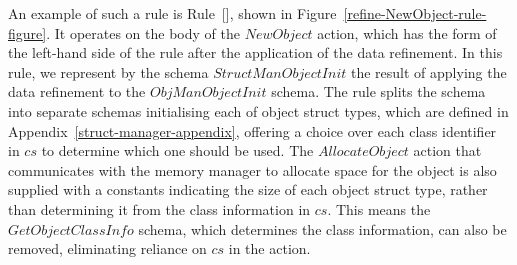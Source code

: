 An example of such a rule is Rule~[],
shown in Figure~\ref{refine-NewObject-rule-figure}.
It operates on the body of the $NewObject$ action, which has the form
of the left-hand side of the rule after the application of the data
refinement.
In this rule, we represent by the schema $StructManObjectInit$ the
result of applying the data refinement to the $ObjManObjectInit$
schema.
The rule splits the schema into separate schemas initialising each of
object struct types, which are defined in
Appendix~\ref{struct-manager-appendix}, offering a choice over each
class identifier in $cs$ to determine which one should be used.
The $AllocateObject$ action that communicates with the memory manager
to allocate space for the object is also supplied with a constants
indicating the size of each object struct type, rather than
determining it from the class information in $cs$.
This means the $GetObjectClassInfo$ schema, which determines the class
information, can also be removed, eliminating reliance on $cs$ in the
action.

